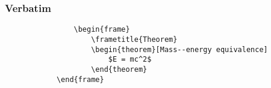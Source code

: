 \documentclass{beamer}
\begin{document}
	
	\begin{frame}[fragile] %
		\frametitle{Verbatim}
		\begin{example}
			\begin{verbatim}
				\begin{frame}
					\frametitle{Theorem}
					\begin{theorem}[Mass--energy equivalence]
						$E = mc^2$
					\end{theorem}
			\end{frame}\end{verbatim}
		\end{example}
	\end{frame}
	
	
\end{document}

